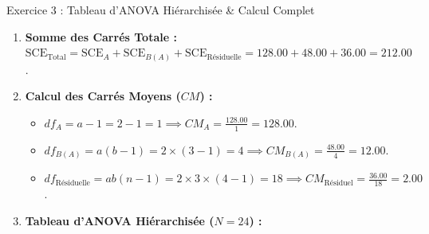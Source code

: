\documentclass[11pt,a4paper]{article}
\begin{document}
\begin{solutionbox}{Exercice 3 : Tableau d'ANOVA Hiérarchisée \& Calcul Complet}
\begin{enumerate}[label=\textbf{\alph*.}]
  \item \textbf{Somme des Carrés Totale :}
  $\text{SCE}_{\text{Total}} = \text{SCE}_A + \text{SCE}_{B(A)} + \text{SCE}_{\text{Résiduelle}} = 128.00 + 48.00 + 36.00 = \mathbf{212.00}$.

  \item \textbf{Calcul des Carrés Moyens ($CM$) :}
  \begin{itemize}
    \item $df_A = a - 1 = 2 - 1 = 1 \implies CM_A = \frac{128.00}{1} = \mathbf{128.00}$.
    \item $df_{B(A)} = a(b - 1) = 2 \times (3 - 1) = 4 \implies CM_{B(A)} = \frac{48.00}{4} = \mathbf{12.00}$.
    \item $df_{\text{Résiduelle}} = ab(n - 1) = 2 \times 3 \times (4 - 1) = 18 \implies CM_{\text{Résiduel}} = \frac{36.00}{18} = \mathbf{2.00}$.
  \end{itemize}

  \item \textbf{Tableau d'ANOVA Hiérarchisée ($N = 24$) :}
  \begin{center}
  \end{center}
\end{enumerate}
\end{solutionbox}
\end{document}
